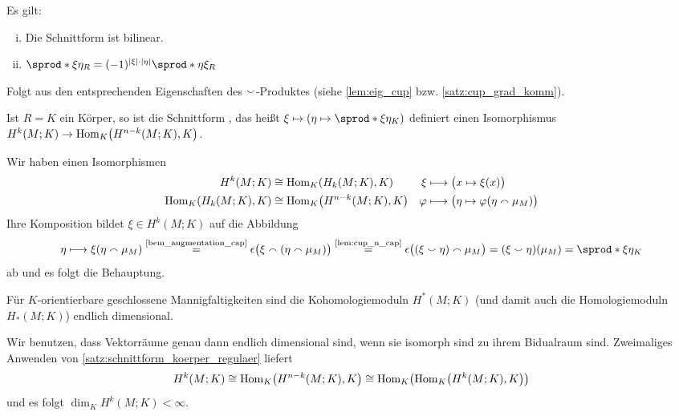\begin{lemma}[{name=[Schnittform ist bilinear und graduiert kommutativ]},label=lem:schnittform_bil_grad_komm]
	Es gilt:
	\begin{enumerate}[(i),itemsep=2pt]
		\item Die Schnittform ist bilinear.
		\item $\sprod*{\xi}{\eta}_R = (-1)^{\abs*{\xi}\cdot \abs*{\eta}} \sprod*{\eta}{\xi}_R$
	\end{enumerate}
\end{lemma}
\begin{beweis}
	Folgt aus den entsprechenden Eigenschaften des $\smallsmile$-Produktes (siehe \ref{lem:eig_cup} bzw. \ref{satz:cup_grad_komm}).
\end{beweis}

\begin{satz}[{name=[Für einen Körper sind Schnittformen regulär]},label=satz:schnittform_koerper_regulaer]
	Ist $R=K$ ein Körper, so ist die Schnittform , das heißt $\xi \mapsto \enbrace*{\eta \mapsto \sprod*{\xi}{\eta}_K}$ definiert einen Isomorphismus $H^k(M;K) \to \Hom_K \enbrace*{H^{n-k}(M;K),K}$.
\end{satz}
\begin{beweis}
	Wir haben einen Isomorphismen
	\begin{align}
		H^k(M;K) &\cong \Hom_K \enbrace*{H_k(M;K),K}  & \xi &\longmapsto  \enbrace[\big]{x \mapsto \xi(x)} \\
		\Hom_K \enbrace*{H_k(M;K),K} &\cong \Hom_K \enbrace*{H^{n-k}(M;K),K}   &  \varphi &\longmapsto  \enbrace[\big]{\eta \mapsto \varphi \enbrace*{\eta \capp \mu_M}}
	\end{align}
	Ihre Komposition bildet $\xi \in H^k(M;K)$ auf die Abbildung
	\[
		\eta \longmapsto \xi \enbrace*{\eta \capp \mu_M} \StackText{\ref{bem_augmentation_cap}}{=} \epsilon \enbrace[\big]{\xi \capp (\eta \capp \mu_M)} \StackText{\ref{lem:cup_n_cap}}{=} \epsilon \enbrace[\big]{(\xi \cupp \eta) \capp \mu_M} = (\xi \cupp \eta)(\mu_M) = \sprod*{\xi}{\eta}_K
	\]
	ab und es folgt die Behauptung.
\end{beweis}

\begin{korollar}[{name=[Kohomologiemoduln über $K$ sind endlichdimensional]}]
	Für $K$-orientierbare geschlossene Mannigfaltigkeiten sind die Kohomologiemoduln $H^*(M;K)$ (und damit auch die Homologiemoduln $H_*(M;K)$) endlich dimensional.
\end{korollar}
\begin{beweis}
	Wir benutzen, dass Vektorräume genau dann endlich dimensional sind, wenn sie isomorph sind zu ihrem Bidualraum sind.
	Zweimaliges Anwenden von \autoref{satz:schnittform_koerper_regulaer} liefert
	\[
		H^k(M;K) \cong \Hom_K \enbrace*{H^{n-k}(M;K),K} \cong \Hom_K \enbrace*{\Hom_K \enbrace*{H^k(M;K),K}} 
	\]
	und es folgt $\dim_K H^k(M;K) < \infty$.
\end{beweis}


